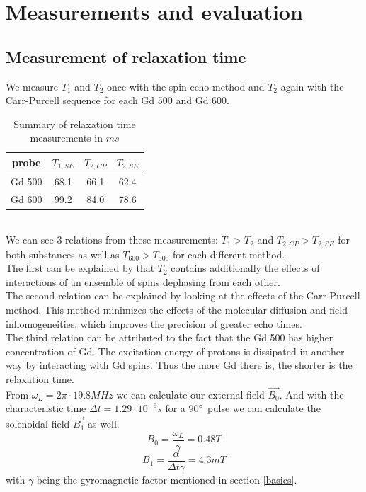 \section{Measurements and evaluation}\label{measurements-and-evaluation}

\subsection{Measurement of relaxation time}\label{relaxation-time}

We measure $T_1$ and $T_2$ once with the spin echo method and $T_2$ again with the Carr-Purcell sequence for each Gd 500 and Gd 600.
\begin{table}[h!]
\centering
\begin{tabular}{c||c|c|c}
probe  &  $T_{1,SE}$ & $T_{2,CP}$ & $T_{2,SE}$ \\
\hline
\hline
Gd 500 & 68.1 & 66.1 & 62.4 \\
\hline
Gd 600 & 99.2 & 84.0 & 78.6 \\
\end{tabular}
\caption{Summary of relaxation time measurements in $ms$}
\label{table1}
\end{table}\\
We can see 3 relations from these measurements: $T_{1} > T_{2}$ and $T_{2,CP} > T_{2,SE}$ for both substances as well as $T_{600} > T_{500}$ for each different method.\\
The first can be explained by that $T_2$ contains additionally the effects of interactions of an ensemble of spins dephasing from each other.\\
The second relation can be explained by looking at the effects of the Carr-Purcell method. This method minimizes the effects of the molecular diffusion and field inhomogeneities, which improves the precision of greater echo times.\\
The third relation can be attributed to the fact that the Gd 500 has higher concentration of Gd. The excitation energy of protons is dissipated in another way by interacting with Gd spins. Thus the more Gd there is, the shorter is the relaxation time.\\
From $\omega_L = 2\pi\cdot19.8 MHz  $ we can calculate our external field $\vec{B_0}$. And with the characteristic time $\Delta t = 1.29\cdot 10^{-6}s $ for a $90\degree$ pulse we can calculate the solenoidal field $\vec{B_1}$ as well.
\begin{equation}
	B_0 = \dfrac{\omega_L}{\gamma} = 0.48 T
\end{equation}
\begin{equation}
	B_1 = \dfrac{\alpha}{\Delta t \gamma} = 4.3 mT
\end{equation}
with $\gamma$ being the gyromagnetic factor mentioned in section \ref{basics}.\\
